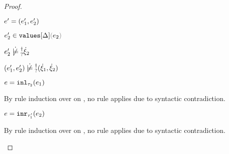 \begin{proof}
\begin{byCases}
\begin{byCases}
\begin{byCases}
\begin{byCases}
\begin{byCases}
\begin{byCases}
              \begin{pfsteps*}
              \item $e'=(e_1' , e_2')$ 
              \item $\inValues{e_2'}{\Delta}{e_2}$  
              \item $\cnotsatisfyormay{e_2'}{\hxi_2}$  
              \item $\cnotsatisfyormay{\hpair{e_1'}{e_2'}}{\cpair{\hxi_1}{\hxi_2}}$ 
              \end{pfsteps*} 
            \end{byCases}
          \end{byCases}
        \end{byCases}
        \item[\text{(\ref{rule:IInl})}] 
        \begin{pfsteps*}
        \item $e=\mathtt{inl}_{\tau_2}({e_1})$ 
        \end{pfsteps*} 
        By rule induction over  on , no rule applies due to syntactic contradiction.
        \item[\text{(\ref{rule:IInr})}] 
        \begin{pfsteps*}
        \item $e=\mathtt{inr}_{\tau_1'}({e_2})$ 
        \end{pfsteps*} 
        By rule induction over  on , no rule applies due to syntactic contradiction.
      \end{byCases}
    \end{byCases}


\end{byCases}
\end{proof}
